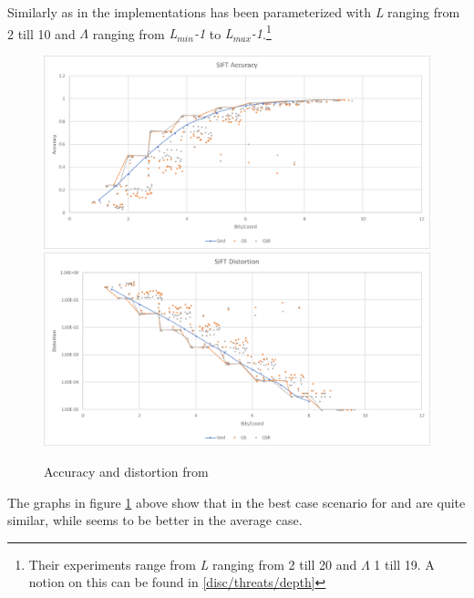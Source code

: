 Similarly as in \cite{wagner17} the \qs{} implementations has been parameterized with \textit{L} ranging from 2 till 10 and $\Lambda$ ranging from \textit{L$_{min}$-1} to \textit{L$_{max}$-1}.\footnote{Their experiments range from \textit{L} ranging from 2 till 20 and $\Lambda$ 1 till 19. A notion on this can be found in \ref{disc/threats/depth}}

\begin{figure}[h!]
\includegraphics[width=\textwidth]{figures/graphs/sift_accuracy}
\includegraphics[width=\textwidth]{figures/graphs/sift_distortion}
\caption{Accuracy and distortion from \sift{}}
\label{fig:graph sift}
\end{figure}
The graphs in figure \ref{fig:graph sift} above show that in the best case scenario for \qs{} and \qsr{} are quite similar, while \qsr{} seems to be better in the average case.

